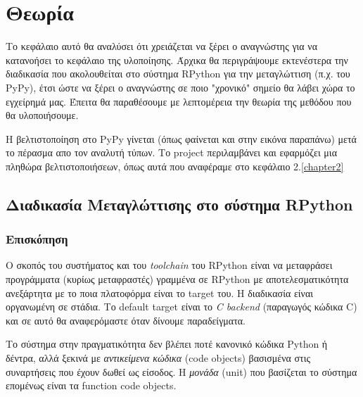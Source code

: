 
\chapter{Θεωρία}
\label{chapter3} 

Το κεφάλαιο αυτό θα αναλύσει ότι χρειάζεται να ξέρει ο αναγνώστης για να
κατανοήσει το κεφάλαιο της υλοποίησης. Άρχικα θα περιγράψουμε εκτενέστερα την
διαδικασία που ακολουθείται στο σύστημα RPython για την μεταγλώττιση (π.χ. του
PyPy), έτσι ώστε να ξέρει ο αναγνώστης σε ποιο "χρονικό" σημείο θα λάβει χώρα το
εγχείρημά μας. Έπειτα θα παραθέσουμε με λεπτομέρεια την θεωρία της μεθόδου που
θα υλοποιήσουμε.

Η βελτιστοποίηση στο PyPy γίνεται (όπως φαίνεται και στην εικόνα παραπάνω) μετά
το πέρασμα απο τον αναλυτή τύπων. Το project περιλαμβάνει και εφαρμόζει μια
πληθώρα βελτιστοποιήσεων, όπως αυτά που αναφέραμε στο κεφάλαιο 2.\ref{chapter2}


\section{Διαδικασία Μεταγλώττισης στο σύστημα RPython}

\subsection{Επισκόπηση}

Ο σκοπός του συστήματος και του \textit{toolchain} του RPython είναι να
μεταφράσει προγράμματα (κυρίως μεταφραστές) γραμμένα σε RPython με
αποτελεσματικότητα ανεξάρτητα με το ποια πλατοφόρμα είναι το target του. Η
διαδικασία είναι οργανωμένη σε στάδια. Το default target είναι το \textit{C
backend} (παραγωγός κώδικα C) και σε αυτό θα αναφερόμαστε όταν δίνουμε
παραδείγματα.

Το σύστημα στην πραγματικότητα δεν βλέπει ποτέ κανονικό κώδικα Python ή δέντρα,
αλλά ξεκινά με \textit{αντικείμενα κώδικα} (code objects) βασισμένα στις
συναρτήσεις που έχουν δωθεί ως είσοδος. Η \textit{μονάδα} (unit) που βασίζεται το σύστημα επομένως είναι τα function code objects.


